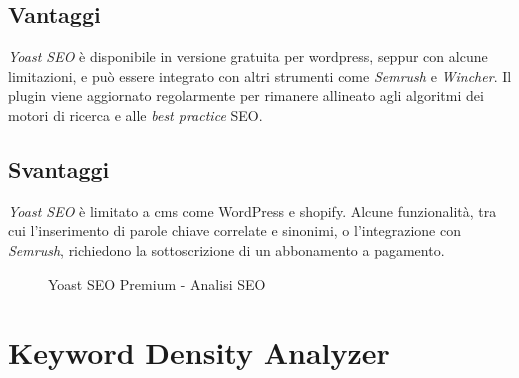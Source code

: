 \subsection{Vantaggi}
\par \textit{Yoast SEO} è disponibile in versione gratuita per \gls{wordpress}, seppur con alcune limitazioni, e può essere integrato con altri strumenti come \textit{Semrush} e \textit{Wincher}. Il plugin viene aggiornato regolarmente per rimanere allineato agli algoritmi dei motori di ricerca e alle \textit{best practice} SEO.

\subsection{Svantaggi}
\par \textit{Yoast SEO} è limitato a \gls{cms} come WordPress e \gls{shopify}. Alcune funzionalità, tra cui l'inserimento di parole chiave correlate e sinonimi, o l'integrazione con \textit{Semrush}, richiedono la sottoscrizione di un abbonamento a pagamento.

\begin{figure}[H]
    \centering 
    \caption{Yoast SEO Premium - Analisi SEO}
\end{figure}

\section{Keyword Density Analyzer}

